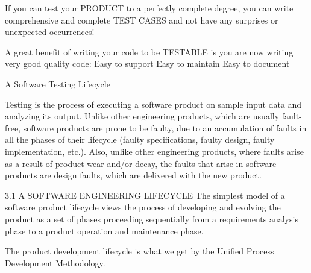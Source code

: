 If you can test your PRODUCT to a perfectly complete degree, you can write comprehensive and complete TEST CASES and not have any surprises or unexpected occurrences!

A great benefit of writing your code to be TESTABLE is you are now writing very good quality code:
Easy to support
Easy to maintain
Easy to document

\newpage

A Software Testing Lifecycle

Testing is the process of executing a software product on sample input data and analyzing its output. Unlike other engineering products, which are usually fault-free, software products are prone to be faulty, due to an accumulation of faults in all the phases of their lifecycle (faulty specifications, faulty design, faulty implementation, etc.). Also, unlike other engineering products, where faults arise as a result of product wear and/or decay, the faults that arise in software products are design faults, which are delivered with the new product.

3.1 A SOFTWARE ENGINEERING LIFECYCLE
The simplest model of a software product lifecycle views the process of developing and evolving the product as a set of phases proceeding sequentially from a requirements analysis phase to a product operation and maintenance phase. 

The product development lifecycle is what we get by the Unified Process Development Methodology.

